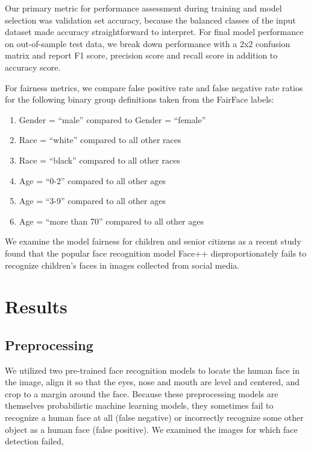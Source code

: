 \documentclass[11pt, letterpaper]{article}
\begin{document}
\begin{multicols}{2}
  Our primary metric for performance assessment during training and model selection
  was validation set accuracy, because the balanced classes of the input dataset made
  accuracy straightforward to interpret. For final model performance on out-of-sample
  test data, we break down performance with a 2x2 confusion matrix and report F1 score,
  precision score and recall score in addition to accuracy score.

  For fairness metrics, we compare false positive rate and false negative rate ratios
  for the following binary group definitions taken from the FairFace labels:

  \begin{enumerate}
  \item Gender = ``male'' compared to Gender = ``female''
  \item Race = ``white'' compared to all other races
  \item Race = ``black'' compared to all other races
  \item Age = ``0-2'' compared to all other ages
  \item Age = ``3-9'' compared to all other ages
  \item Age = ``more than 70'' compared to all other ages
  \end{enumerate}

  We examine the model fairness for children and senior citizens as a recent
  study \cite{9156262} found that the popular face recognition model Face++
  disproportionately fails to recognize children's faces in images collected from
  social media.

  \section{Results}

  \subsection{Preprocessing}

  We utilized two pre-trained face recognition models to locate the human face
  in the image, align it so that the eyes, nose and mouth are level and centered,
  and crop to a margin around the face. Because these preprocessing models are
  themselves probabilistic machine learning models, they sometimes fail to recognize
  a human face at all (false negative) or incorrectly recognize some other object
  as a human face (false positive). We examined the images for which face detection
  failed,


\end{multicols}
\end{document}

